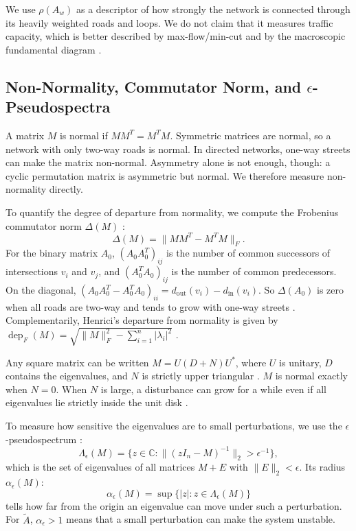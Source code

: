 \documentclass[journal]{IEEEtran}
\begin{document}
We use $\rho(A_w)$ as a descriptor of how strongly the network is connected through its heavily weighted roads and loops. We do not claim that it measures traffic capacity, which is better described by max-flow/min-cut and by the macroscopic fundamental diagram \cite{Geroliminis2008, Daganzo2008}.

\subsection{Non-Normality, Commutator Norm, and $\epsilon$-Pseudospectra}
A matrix $M$ is normal if $M M^T = M^T M$. Symmetric matrices are normal, so a network with only two-way roads is normal. In directed networks, one-way streets can make the matrix non-normal. Asymmetry alone is not enough, though: a cyclic permutation matrix is asymmetric but normal. We therefore measure non-normality directly.

To quantify the degree of departure from normality, we compute the Frobenius commutator norm $\Delta(M)$ \cite{Henrici1962, Asllani2018}:
\begin{equation}
\Delta(M) = \| M M^T - M^T M \|_F.
\label{eq:commutator}
\end{equation}
For the binary matrix $A_0$, $(A_0 A_0^T)_{ij}$ is the number of common successors of intersections $v_i$ and $v_j$, and $(A_0^T A_0)_{ij}$ is the number of common predecessors. On the diagonal, $(A_0 A_0^T - A_0^T A_0)_{ii} = d_{\text{out}}(v_i) - d_{\text{in}}(v_i)$. So $\Delta(A_0)$ is zero when all roads are two-way and tends to grow with one-way streets \cite{Asllani2018}. Complementarily, Henrici's departure from normality is given by $\operatorname{dep}_F(M) = \sqrt{\|M\|_F^2 - \sum_{i=1}^n |\lambda_i|^2}$ \cite{Henrici1962, Elsner1987}.

Any square matrix can be written $M = U (D + N) U^*$, where $U$ is unitary, $D$ contains the eigenvalues, and $N$ is strictly upper triangular \cite{Horn2013}. $M$ is normal exactly when $N = 0$. When $N$ is large, a disturbance can grow for a while even if all eigenvalues lie strictly inside the unit disk \cite{Trefethen2005}.

To measure how sensitive the eigenvalues are to small perturbations, we use the $\epsilon$-pseudospectrum \cite{Trefethen2005}:
\begin{equation}
\Lambda_\epsilon(M) = \{ z \in \mathbb{C} : \|(z I_n - M)^{-1}\|_2 > \epsilon^{-1} \},
\label{eq:pseudospectrum}
\end{equation}
which is the set of eigenvalues of all matrices $M + E$ with $\|E\|_2 < \epsilon$. Its radius $\alpha_\epsilon(M)$:
\begin{equation}
\alpha_\epsilon(M) = \sup \{ |z| : z \in \Lambda_\epsilon(M) \}
\label{eq:pseudospectral_radius}
\end{equation}
tells how far from the origin an eigenvalue can move under such a perturbation. For $\tilde{A}$, $\alpha_\epsilon > 1$ means that a small perturbation can make the system unstable.
\end{document}
